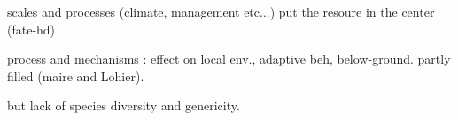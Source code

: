 scales and processes (climate, management etc...)
put the resoure in the center (fate-hd)

process and mechanisms
\parencite{berger_competition_2008}: effect on local env., adaptive beh, below-ground.
partly filled (maire and Lohier).

but lack of species diversity and genericity. 

%
%
%
%
